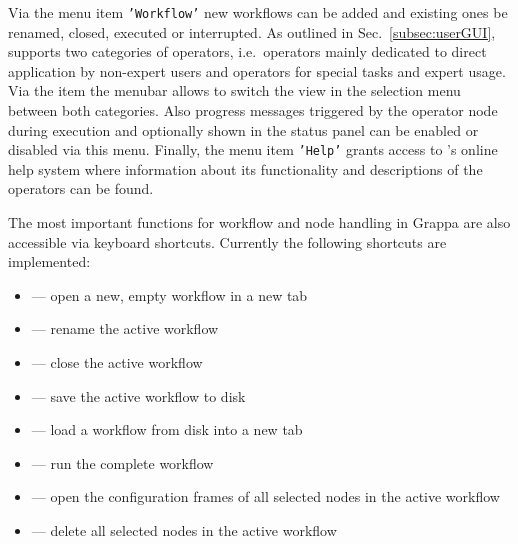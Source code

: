 Via the menu item {\tt 'Workflow'} new workflows can be added and existing ones be renamed, 
closed, executed or interrupted.  
As outlined in Sec.~\ref{subsec:userGUI}, \alida supports two categories of
operators, i.e.~operators mainly dedicated to direct application by non-expert users
and operators for special tasks and expert usage. Via the item  the menubar allows
to switch the view in the selection menu between both categories. Also progress messages triggered by the
operator node during execution and optionally shown in the status panel can be enabled or
disabled via this menu. Finally, the menu item {\tt 'Help'} grants access to \alida's online help system
where information about its functionality and descriptions of the operators can be found.

The most important functions for workflow and node handling in Grappa are also
accessible via keyboard shortcuts. Currently the following shortcuts are
implemented:
\begin{itemize} 
  \item {} \hspace*{0.5cm} --- \hspace*{0.5cm}
  	open a new, empty workflow in a new tab
  \item {} \hspace*{0.5cm} --- \hspace*{0.5cm}
  	rename the active workflow
  \item {} \hspace*{0.5cm} --- \hspace*{0.5cm}
  	close the active workflow
  \item {} \hspace*{0.5cm} --- \hspace*{0.5cm}
	save the active workflow to disk
  \item {} \hspace*{0.5cm} --- \hspace*{0.5cm}
  	load a workflow from disk into a new tab
  \item {} \hspace*{0.5cm} --- \hspace*{0.5cm}
	run the complete workflow
  \item {} \hspace*{0.5cm} --- \hspace*{0.5cm} 
	open the configuration frames of all selected nodes in the active workflow
  \item {} \hspace*{0.5cm} --- \hspace*{0.5cm}
	delete all selected nodes in the active workflow
\end{itemize}
